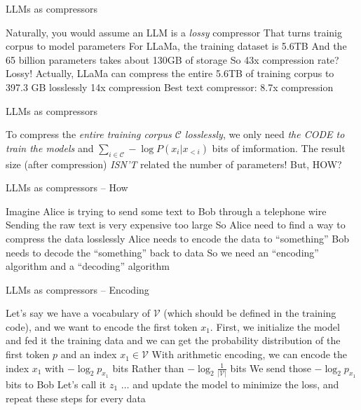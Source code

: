 \documentclass[scheme=plain]{ctexbeamer}
\begin{document}
\begin{frame}{LLMs as compressors}
  \begin{outline}
    \1 Naturally, you would assume an LLM is a \emph{lossy} compressor
      \2 That turns trainig corpus to model parameters
      \2 For LLaMa, the training dataset is 5.6TB
      \2 And the 65 billion parameters takes about 130GB of storage
        \3 So 43x compression rate?
        \3 Lossy!
    \pause
    \1 Actually, LLaMa can compress the entire 5.6TB of training corpus to 397.3 GB losslessly
      \2 14x compression
      \2 Best text compressor: 8.7x compression
  \end{outline}
\end{frame}



\begin{frame}{LLMs as compressors}
  \begin{outline}
    \1 To compress the \emph{entire training corpus $\mathcal{C}$ losslessly}, we only need \emph{the CODE to train the models} and $\sum_{i \in \mathcal{C}} - \log P(x_i | x_{<i}) $ bits of imformation.
      \2 The result size (after compression) \emph{ISN'T} related the number of parameters!
      \pause
    \1 But, HOW?
  \end{outline}
\end{frame}

\begin{frame}{LLMs as compressors -- How}
  \begin{outline}
    \1 Imagine Alice is trying to send some text to Bob through a telephone wire
    \1 Sending the raw text is very expensive
      \2 too large
    \1 So Alice need to find a way to compress the data losslessly
    \1 Alice needs to encode the data to ``something''
    \1 Bob needs to decode the ``something'' back to data
    \1 So we need an ``encoding'' algorithm and a ``decoding'' algorithm
  \end{outline}
\end{frame}

\begin{frame}{LLMs as compressors -- Encoding}
  \begin{outline}
    \1 Let's say we have a vocabulary of \(\mathcal{V}\) (which should be defined in the training code), and we want to encode the first token \(x_1\).
    \pause
    \1 First, we initialize the model and fed it the training data
      \2 and we can get the probability distribution of the first token $p$ and an index $x_1 \in \mathcal{V}$
      \pause
    \1 With arithmetic encoding, we can encode the index $x_1$ with $-\log_2 p_{x_1}$ bits
      \2 Rather than $-\log_2 \frac{1}{|\mathcal{V}|}$ bits
      \pause
    \1 We send those $-\log_2 p_{x_1}$ bits to Bob
      \2 Let's call it $z_1$
      \pause
    \1 $\dots$ and update the model to minimize the loss, and repeat these steps for every data
  \end{outline}
\end{frame}
\end{document}
